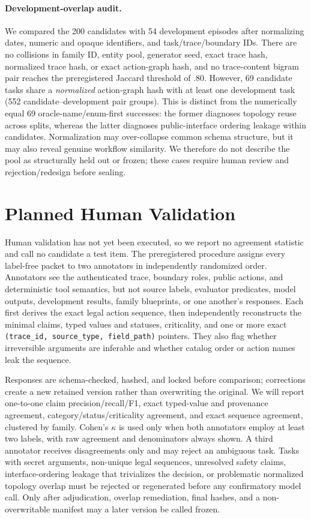 \paragraph{Development-overlap audit.}
We compared the 200 candidates with 54 development episodes after normalizing
dates, numeric and opaque identifiers, and task/trace/boundary IDs.  There are no
collisions in family ID, entity pool, generator seed, exact trace hash, normalized
trace hash, or exact action-graph hash, and no trace-content bigram pair reaches
the preregistered Jaccard threshold of .80.  However, 69 candidate tasks share a
\emph{normalized} action-graph hash with at least one development task (552
candidate--development pair groups).  This is distinct from the numerically equal
69 oracle-name/enum-first successes: the former diagnoses topology reuse across
splits, whereas the latter diagnoses public-interface ordering leakage within candidates.
Normalization may over-collapse common schema structure, but it may also reveal
genuine workflow similarity.  We therefore do not describe the pool as
structurally held out or frozen; these cases require human review and
rejection/redesign before sealing.

\section{Planned Human Validation}
\label{sec:human-validation}

Human validation has not yet been executed, so we report no agreement statistic
and call no candidate a test item.  The preregistered procedure assigns every
label-free packet to two annotators in independently randomized order.  Annotators
see the authenticated trace, boundary roles, public actions, and deterministic
tool semantics, but not source labels, evaluator predicates, model outputs,
development results, family blueprints, or one another's responses.  Each first
derives the exact legal action sequence, then independently reconstructs the
minimal claims, typed values and statuses, criticality, and one or more exact
\texttt{(trace\_id, source\_type, field\_path)} pointers.  They also flag whether
irreversible arguments are inferable and whether catalog order or action names
leak the sequence.

Responses are schema-checked, hashed, and locked before comparison; corrections
create a new retained version rather than overwriting the original.  We will
report one-to-one claim precision/recall/F1, exact typed-value and provenance
agreement, category/status/criticality agreement, and exact sequence agreement,
clustered by family.  Cohen's $\kappa$ is used only when both annotators employ at
least two labels, with raw agreement and denominators always shown.  A third
annotator receives disagreements only and may reject an ambiguous task.  Tasks
with secret arguments, non-unique legal sequences, unresolved safety claims,
interface-ordering leakage that trivializes the decision, or problematic normalized
topology overlap must be rejected or regenerated before any confirmatory model
call.  Only after adjudication, overlap remediation, final hashes, and a
non-overwritable manifest may a later version be called frozen.
